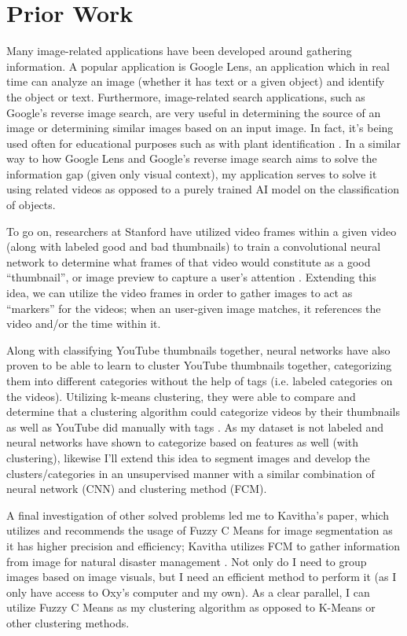 \documentclass[10pt,twocolumn]{article}
\begin{document}
\section{Prior Work}

Many image-related applications have been developed around gathering information. A popular application is Google Lens, an application which in real time can analyze an image (whether it has text or a given object) and identify the object or text. Furthermore, image-related search applications, such as Google’s reverse image search, are very useful in determining the source of an image or determining similar images based on an input image. In fact, it’s being used often for educational purposes such as with plant identification \cite{Moore2018}. In a similar way to how Google Lens and Google’s reverse image search aims to solve the information gap (given only visual context), my application serves to solve it using related videos as opposed to a purely trained AI model on the classification of objects.

To go on, researchers at Stanford have utilized video frames within a given video (along with labeled good and bad thumbnails) to train a convolutional neural network to determine what frames of that video would constitute as a good “thumbnail”, or image preview to capture a user’s attention \cite{Stanford2017}. Extending this idea, we can utilize the video frames in order to gather images to act as “markers” for the videos; when an user-given image matches, it references the video and/or the time within it.

Along with classifying YouTube thumbnails together, neural networks have also proven to be able to learn to cluster YouTube thumbnails together, categorizing them into different categories without the help of tags (i.e. labeled categories on the videos). Utilizing k-means clustering, they were able to compare and determine that a clustering algorithm could categorize videos by their thumbnails as well as YouTube did manually with tags \cite{Stanford2021}. As my dataset is not labeled and neural networks have shown to categorize based on features as well (with clustering), likewise I'll extend this idea to segment images and develop the clusters/categories in an unsupervised manner with a similar combination of neural network (CNN) and clustering method (FCM).

A final investigation of other solved problems led me to Kavitha's paper, which utilizes and recommends the usage of Fuzzy C Means for image segmentation as it has higher precision and efficiency; Kavitha utilizes FCM to gather information from image for natural disaster management \cite{Kavitha2020}. Not only do I need to group images based on image visuals, but I need an efficient method to perform it (as I only have access to Oxy's computer and my own). As a clear parallel, I can utilize Fuzzy C Means as my clustering algorithm as opposed to K-Means or other clustering methods.
\end{document}
